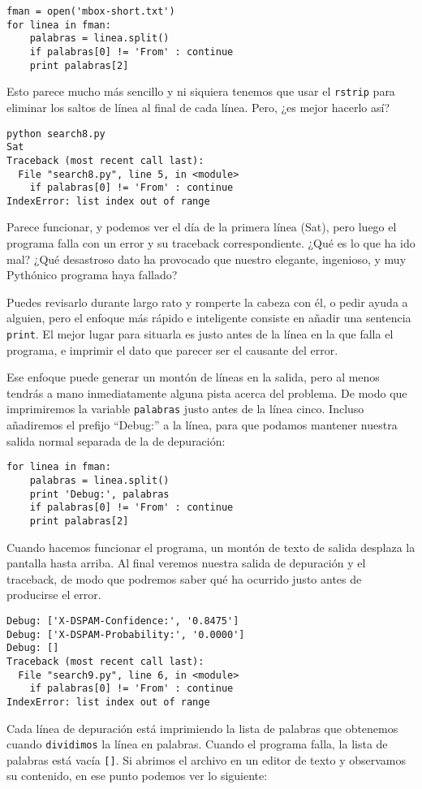 \begin{enumerate}
\beforeverb
\begin{verbatim}
fman = open('mbox-short.txt')
for linea in fman:
    palabras = linea.split()
    if palabras[0] != 'From' : continue
    print palabras[2]
\end{verbatim}
\afterverb
%
Esto parece mucho más sencillo y ni siquiera tenemos que usar el
{\tt rstrip} para eliminar los saltos de línea al final de cada línea.
Pero, ¿es mejor hacerlo así?

\beforeverb
\begin{verbatim}
python search8.py 
Sat
Traceback (most recent call last):
  File "search8.py", line 5, in <module>
    if palabras[0] != 'From' : continue
IndexError: list index out of range
\end{verbatim}
\afterverb
%
Parece funcionar, y podemos ver el día de la primera línea
(Sat), pero luego el programa falla con un error y su traceback correspondiente.
¿Qué es lo que ha ido mal? ¿Qué desastroso dato ha provocado que nuestro elegante,
ingenioso, y muy Pythónico programa haya fallado?

Puedes revisarlo durante largo rato y romperte la cabeza
con él, o pedir ayuda a alguien, pero el enfoque más
rápido e inteligente consiste en añadir una sentencia {\tt print}. El mejor lugar
para situarla es justo antes de la línea en la que
falla el programa, e imprimir el dato que parecer ser el causante
del error.

Ese enfoque puede generar un montón de líneas en la salida, pero
al menos tendrás a mano inmediatamente alguna pista acerca
del problema. De modo que imprimiremos la variable
{\tt palabras} justo antes de la línea cinco. Incluso
añadiremos el prefijo ``Debug:'' a la línea, para que
podamos mantener nuestra salida normal separada de la de depuración:

\beforeverb
\begin{verbatim}
for linea in fman:
    palabras = linea.split()
    print 'Debug:', palabras
    if palabras[0] != 'From' : continue
    print palabras[2]
\end{verbatim}
\afterverb
%
Cuando hacemos funcionar el programa, un montón de texto de salida
desplaza la pantalla hasta arriba. Al final veremos nuestra salida
de depuración y el traceback, de modo que podremos saber qué
ha ocurrido justo antes de producirse el error.

\beforeverb
\begin{verbatim}
Debug: ['X-DSPAM-Confidence:', '0.8475']
Debug: ['X-DSPAM-Probability:', '0.0000']
Debug: []
Traceback (most recent call last):
  File "search9.py", line 6, in <module>
    if palabras[0] != 'From' : continue
IndexError: list index out of range
\end{verbatim}
\afterverb
%
Cada línea de depuración está imprimiendo la lista de palabras que obtenemos
cuando {\tt dividimos} la línea en palabras. Cuando el programa falla,
la lista de palabras está vacía \verb"[]". Si abrimos el archivo en un
editor de texto y observamos su contenido, en ese punto podemos ver
lo siguiente:


\end{enumerate}
